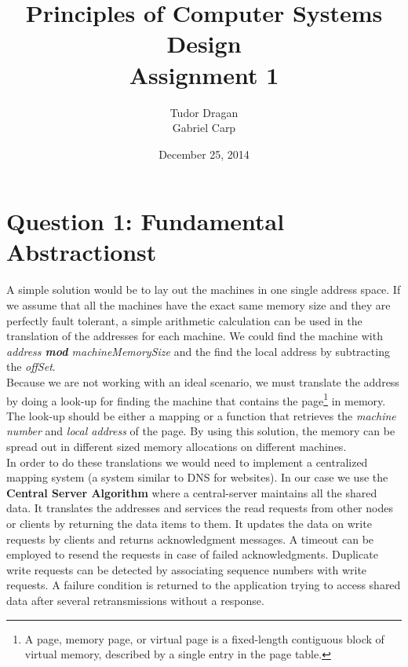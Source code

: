\documentclass{article}      %
\title{\bf Principles of Computer Systems Design\\ {\Large Assignment 1}}  %
\author{Tudor Dragan\\
Gabriel Carp}      %
\date{December 25, 2014}      %
\begin{document}

\maketitle                   %

\section{Question 1: Fundamental Abstractionst}      %

A simple solution would be to lay out the machines in one single address space. If we assume that all the machines have the exact same memory size and they are perfectly fault tolerant, a simple arithmetic calculation can be used in the translation of the addresses for each machine. We could find the machine with \emph{address {\bf mod} machineMemorySize } and the find the local address by subtracting the \emph{offSet}.\\

Because we are not working with an ideal scenario, we must translate the address by doing a look-up for finding the machine that contains the page\footnote{A page, memory page, or virtual page is a fixed-length contiguous block of virtual memory, described by a single entry in the page table.} in memory. The look-up should be either a mapping or a function that retrieves the \emph{machine number} and \emph{local address} of the page. By using this solution, the memory can be spread out in different sized memory allocations on different machines.\\

In order to do these translations we would need to implement a centralized mapping system (a system similar to DNS for websites). In our case we use the \textbf{Central Server Algorithm} where a central-server maintains all the shared data. It translates the addresses and services the read requests from other nodes or clients by returning the data items to them. It updates the data on write requests by clients and returns acknowledgment messages. A timeout can be employed to resend the requests in case of failed acknowledgments. Duplicate write requests can be detected by associating sequence numbers with write requests. A failure condition is returned to the application trying to access shared data after several retransmissions without a response.\\
\end{document}

